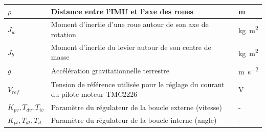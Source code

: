 \begin{longtable}{p{} p{} p{}}
\hline
$\rho$ & Distance entre l'IMU et l'axe des roues & \si{\metre} \\
\hline
$J_w$ & Moment d'inertie d'une roue autour de son axe de rotation & \si{\kilogram\metre\squared} \\
\hline
$J_b$ & Moment d'inertie du levier autour de son centre de masse & \si{\kilogram\metre\squared} \\
\hline
$g$ & Accélération gravitationnelle terrestre & \si{\metre\per\second\squared} \\
\hline
$V_{ref}$ & Tension de référence utilisée pour le réglage du courant du pilote moteur TMC2226 & \si{\volt} \\
\hline
$K_{pv},T_{dv},T_{iv}$ & Paramètre du régulateur de la boucle externe (vitesse) & - \\
\hline
$K_{pt},T_{dt},T_{it}$ & Paramètre du régulateur de la boucle interne (angle) & - \\
\hline
\end{longtable}
